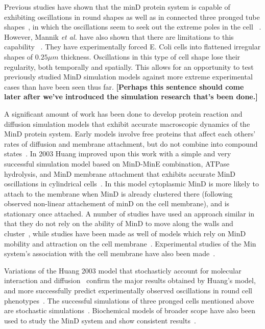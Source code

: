 \documentclass[letterpaper,twocolumn,amsmath,amssymb,pre]{revtex4-1}
\newcommand{\red}[1]{{\bf \color{red} #1}}
\newcommand{\fixme}[1]{\red{[#1]}}
\begin{document}
Previous studies have shown that the minD protein system is capable of
exhibiting oscillations in round shapes \cite{fange2006noise}as well
as in connected three pronged tube shapes~\cite{varma2008min}, in
which the oscillations seem to seek out the extreme poles in the
cell~\cite{corbin2002exploring} \cite{juarez2010changes}. However,
Mannik \emph{et al.} have also shown that there are limitations to
this capability~\cite{mannik2010bacteria}
\cite{mannik2009bacterial}. They have experimentally forced E. Coli
cells into flattened irregular shapes of $0.25\mu m$
thickness. Oscillations in this type of cell shape lose their
regularity, both temporally and spatially. This allows for an
opportunity to test previously studied MinD simulation models against
more extreme experimental cases than have been seen thus
far. \fixme{Perhaps this sentence should come later after we've
  introduced the simulation research that's been done.}

A significant amount of work has been done to develop protein reaction
and diffusion simulation models that exhibit accurate macroscopic
dynamics of the MinD protein system. Early models involve free
proteins that affect each others' rates of diffusion and membrane
attachment, but do not combine into compound
states~\cite{meinhardt2001pattern}.  In 2003 Huang improved upon this
work with a simple and very successful simulation model based on
MinD-MinE combination, ATPase hydrolysis, and MinD membrane attachment
that exhibits accurate MinD oscillations in cylindrical
cells~\cite{huang2003dynamic}. In this model cytoplasmic MinD is more
likely to attach to the membrane when MinD is already clustered there
(following observed non-linear attachement of minD on the cell
membrane), and is stationary once attached.  A number of studies have
used an approach similar in that they do not rely on the ability of
MinD to move along the walls and
cluster~\cite{kruse2007experimentalist, meinhardt2001pattern,
  drew2005polymerization, fange2006noise, kerr2006division}, while
studies have been made as well of models which rely on MinD mobility
and attraction on the cell membrane~\cite{kruse2002dynamic,
  howard2005cellular}.  Experimental studies of the Min system's
association with the cell membrane have also been
made~\cite{hsieh2010direct,mileykovskaya2003effects}.

Variations of the Huang 2003 model that stochasticly account for
molecular interaction and
diffusion~\cite{kerr2006division,fange2006noise} confirm the major
results obtained by Huang's model, and more successfully predict
experimentally observed oscillations in round cell
phenotypes~\cite{fange2006noise, huang2004min}. The successful
simulations of three pronged cells mentioned above are stochastic
simulations~\cite{varma2008min}. Biochemical models of broader scope
have also been used to study the MinD system and show consistent
results~\cite{arjunan2010new}.
\end{document}
